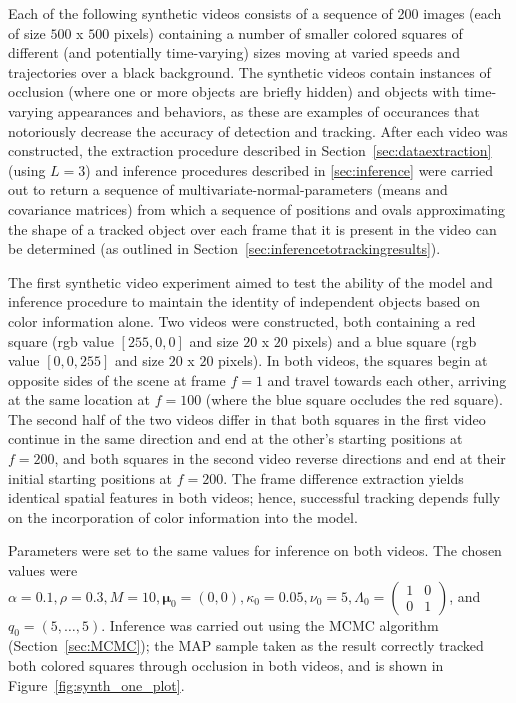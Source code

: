 \documentclass[twocolumn, final]{svjour3}
\begin{document}
Each of the following synthetic videos consists of a sequence of 200 images (each of size $500$ x $500$ pixels) containing a number of smaller colored squares of different (and potentially time-varying) sizes moving at varied speeds and trajectories over a black background. The synthetic videos contain instances of occlusion (where one or more objects are briefly hidden) and objects with time-varying appearances and behaviors, as these are examples of occurances that notoriously decrease the accuracy of detection and tracking. After each video was constructed, the extraction procedure described in Section~\ref{sec:dataextraction} (using $L=3$) and inference procedures described in \ref{sec:inference} were carried out to return a sequence of multivariate-normal-parameters (means and covariance matrices) from which a sequence of positions and ovals approximating the shape of a tracked object over each frame that it is present in the video can be determined (as outlined in Section~\ref{sec:inferencetotrackingresults}).

The first synthetic video experiment aimed to test the ability of the model and inference procedure to maintain the identity of independent objects based on color information alone. Two videos were constructed, both containing a red square (rgb value $[255,0,0]$ and size $20$ x $20$ pixels) and a blue square (rgb value $[0,0,255]$ and size $20$ x $20$ pixels). In both videos, the squares begin at opposite sides of the scene at frame $f=1$ and travel towards each other, arriving at the same location at $f=100$ (where the blue square occludes the red square). The second half of the two videos differ in that both squares in the first video continue in the same direction and end at the other's starting positions at $f=200$, and both squares in the second video reverse directions and end at their initial starting positions at $f=200$. The frame difference extraction yields identical spatial features in both videos; hence, successful tracking depends fully on the incorporation of color information into the model.

Parameters were set to the same values for inference on both videos. The chosen values were $\alpha = 0.1, \rho = 0.3, M = 10, \boldsymbol{\mu}_{0} = (0,0), \kappa_{0} = 0.05, \nu_{0} = 5, \Lambda_{0} = \left( \begin{smallmatrix} 1&0\\ 0&1 \end{smallmatrix} \right)$, and $q_{0} = (5, \ldots, 5)$. Inference was carried out using the MCMC algorithm (Section~\ref{sec:MCMC}); the MAP sample taken as the result correctly tracked both colored squares through occlusion in both videos, and is shown in Figure~\ref{fig:synth_one_plot}. 
\end{document}
